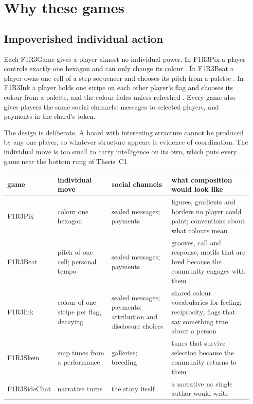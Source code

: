 \documentclass[11pt,a4paper]{article}
\begin{document}
\section{Why these games}\label{sec:games}

\subsection{Impoverished individual action}

Each F1R3Game gives a player almost no individual power. In F1R3Pix a player controls exactly one
hexagon and can only change its colour \cite{pix-design}. In F1R3Beat a player owns one cell of a
step sequencer and chooses its pitch from a palette \cite{beat-design}. In F1R3Ink a player holds
one stripe on each other player's flag and chooses its colour from a palette, and the colour fades
unless refreshed \cite{ink-design}. Every game also gives players the same social channels:
messages to selected players, and payments in the shard's token.

The design is deliberate. A board with interesting structure cannot be produced by any one
player, so whatever structure appears is evidence of coordination. The individual move is too
small to carry intelligence on its own, which puts every game near the bottom rung of Thesis~C1.

\begin{center}\small
\begin{tabularx}{\linewidth}{@{}l>{\raggedright\arraybackslash}p{34mm}>{\raggedright\arraybackslash}p{30mm}X@{}}
\toprule
game & individual move & social channels & what composition would look like \\
\midrule
F1R3Pix & colour one hexagon & sealed messages; payments & figures, gradients and borders no
  player could paint; conventions about what colours mean \\
F1R3Beat & pitch of one cell; personal tempo & sealed messages; payments & grooves, call and
  response, motifs that are bred because the community engages with them \\
F1R3Ink & colour of one stripe per flag, decaying & sealed messages; payments; attribution and
  disclosure choices & shared colour vocabularies for feeling; reciprocity; flags that say
  something true about a person \\
F1R3Skein & snip tunes from a performance & galleries; breeding & tunes that survive selection
  because the community returns to them \\
F1R3SideChat & narrative turns & the story itself & a narrative no single author would write \\
\bottomrule
\end{tabularx}
\end{center}
\end{document}
